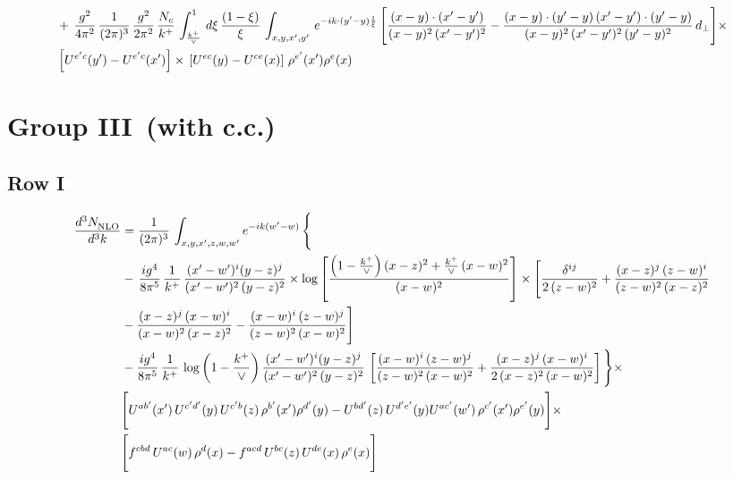 \documentclass[9pt]{article}
\numberwithin{equation}{section}
\begin{document}
\begin{align}
& +\,\frac{g^{2}}{4\pi^{2}}\, \frac{1}{(2\pi)^{3}}\,\frac{g^{2}}{2\pi^{2}}\, \frac{N_{c}}{k^{+}}\,\int_{\frac{k^{+}}{\vee}}^{1}\,d\xi\, \frac{(1-\xi)}{\xi}\, \int_{x,y,x',y'}\,e^{-ik\cdot (y'-y)\frac{1}{\xi}}\,\Bigg[\frac{(x-y)\cdot (x'-y')}{(x-y)^{2}\, (x'-y')^{2}} -\frac{(x-y)\cdot (y'-y)\, (x'-y')\cdot (y'-y)}{(x-y)^{2}\,(x'-y')^{2}\,(y'-y)^{2}}\,d_{\perp}\Bigg]\times\notag \\ &  \left[U^{e'c}(y') - U^{e'c}(x')\right] \times\, \left[U^{ec}(y) - U^{ce}(x)\right]\, \rho^{e'}(x') \rho^{e}(x)
\end{align}
\section{Group III\, (with c.c.)}
\subsection{Row I}
\begin{align}
     \frac{d^{3}N_{\rm NLO}^{\rm}}{d^{3}k}  & =   \frac{1}{(2\pi)^{3}}\, \int_{x,y,x',z,w,w^{\prime}} e^{-ik(w^{\prime}-w)}\, \Bigg\{\notag \\
& -\,\frac{ig^{4}}{8\pi^{5}}\,\frac{1}{k^{+}}\,\frac{(x'-w')^{i}(y-z)^{j}}{(x'-w')^{2}\,(y-z)^{2}}\times \log{\left[\frac{\left(1-\frac{k^{+}}{\vee}\right)(x-z)^{2}+\frac{k^{+}}{\vee}\,(x-w)^{2}}{(x-w)^{2}}\right]}\times \Bigg[\frac{\delta^{ij}}{2\,(z-w)^{2}}+\frac{(x-z)^{j}\,(z-w)^{i}}{(z-w)^{2}\,(x-z)^{2}}\notag \\ & -\frac{(x-z)^{j}\,(x-w)^{i}}{(x-w)^{2}\,(x-z)^{2}}-\frac{(x-w)^{i}\,(z-w)^{j}}{(z-w)^{2}\,(x-w)^{2}}\Bigg] \notag \\
& -\frac{ig^{4}}{8\pi^{5}}\,\frac{1}{k^{+}}\,\log{\left(1-\frac{k^{+}}{\vee}\right)}\,\frac{(x'-w')^{i}(y-z)^{j}}{(x'-w')^{2}\,(y-z)^{2}}\,\left[\frac{(x-w)^{i}\,(z-w)^{j}}{(z-w)^{2}\,(x-w)^{2}}+\frac{(x-z)^{j}\,(x-w)^{i}}{2\,(x-z)^{2}\, (x-w)^{2}}\right]\Bigg\}\times \notag \\ &  \Bigg[U^{ab'}(x')\,U^{c'd'}(y)\,U^{c'b}(z)\,\rho^{b'}(x')\rho^{d'}(y)-U^{bd'}(z)\,U^{d'e'}(y)U^{ac'}(w')\,\rho^{c'}(x')\rho^{e'}(y)\Bigg]\times\notag \\ & \Bigg[f^{cbd}\,U^{ac}(w)\,\rho^{d}(x)-f^{acd}\, U^{bc}(z)\,U^{de}(x)\,\rho^{e}(x)\Bigg]
\end{align}
\end{document}
